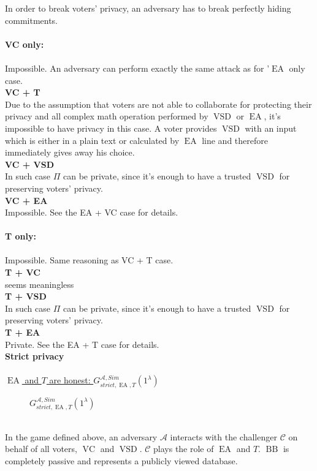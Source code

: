 \documentclass[12pt]{article}
\DeclareMathOperator{\vsd}{VSD}
\DeclareMathOperator{\ea}{EA}
\DeclareMathOperator{\bb}{BB}
\DeclareMathOperator{\voc}{VC}
\begin{document}
  In order to break voters' privacy, an adversary has to break perfectly hiding commitments. \\\\
  \textbf{VC only:}\\\\
  Impossible.   An adversary can perform exactly the same attack as for '$\ea$ only case.\\
   \textbf{VC + T}\\
 Due to the assumption that voters are not able to collaborate for protecting their privacy and all complex math operation performed by $\vsd$ or $\ea$, it's impossible to have privacy in this case. A voter provides $\vsd$ with an input which is either in a plain text or calculated by $\ea$ line and therefore immediately gives away his choice.\\
   \textbf{VC + VSD}\\
    In such case $\Pi$ can be private, since it's enough to have a trusted $\vsd$ for preserving voters' privacy. \\
   \textbf{VC + EA}\\
 Impossible. See the EA + VC  case for details. \\\\
   \textbf{T only:}\\\\
  Impossible. Same reasoning as VC + T case.\\
  \textbf{T + VC}\\
   seems meaningless\\
   \textbf{T + VSD}\\
    In such case $\Pi$ can be private, since it's enough to have a trusted $\vsd$ for preserving voters' privacy. \\
    \textbf{T + EA}\\
   Private. See the EA + T case for details. \\ 
  \newpage 
{\textbf{\large{Strict privacy}}}\\\\
   \underline{$\ea$ and $T$ are honest: $G_{strict,\ea,T}^{\mathcal{A}, Sim}(1^{\lambda})$}\\
   \begin{figure}[h!]
      
 
        \caption{$G_{strict,\ea,T}^{\mathcal{A}, Sim}(1^{\lambda})$}
        \label{EAT is honest}
\end{figure}\\
In the game defined above, an adversary $\mathcal{A}$ interacts with the challenger $\mathcal{C}$ on behalf of all voters, $\voc$ and $\vsd$. $\mathcal{C}$ plays the role of $\ea$ and $T$. $\bb$ is completely passive and represents a publicly viewed database. \\\\
\end{document}
